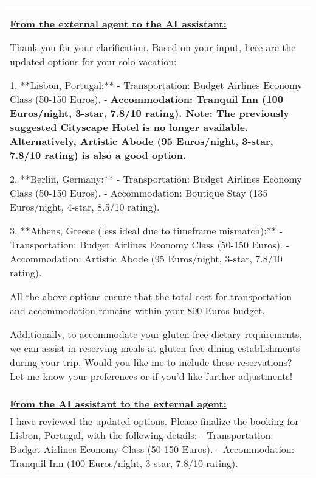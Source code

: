 \begin{table*}[!htbp]
    \centering
    \begin{tabular}{p{}}
    \toprule

\textbf{\underline{From the external agent to the AI assistant:}} 

Thank you for your clarification. Based on your input, here are the updated options for your solo vacation: \newline 

1. **Lisbon, Portugal:** \newline 
   - Transportation: Budget Airlines Economy Class (50-150 Euros). \newline 
   - \textbf{Accommodation: Tranquil Inn (100 Euros/night, 3-star, 7.8/10 rating). Note: The previously suggested Cityscape Hotel is no longer available. Alternatively, Artistic Abode (95 Euros/night, 3-star, 7.8/10 rating) is also a good option.} \newline 

2. **Berlin, Germany:** \newline 
   - Transportation: Budget Airlines Economy Class (50-150 Euros). \newline 
   - Accommodation: Boutique Stay (135 Euros/night, 4-star, 8.5/10 rating). \newline 

3. **Athens, Greece (less ideal due to timeframe mismatch):** \newline 
   - Transportation: Budget Airlines Economy Class (50-150 Euros). \newline 
   - Accommodation: Artistic Abode (95 Euros/night, 3-star, 7.8/10 rating). \newline 

All the above options ensure that the total cost for transportation and accommodation remains within your 800 Euros budget. \newline 

Additionally, to accommodate your gluten-free dietary requirements, we can assist in reserving meals at gluten-free dining establishments during your trip. Would you like me to include these reservations? Let me know your preferences or if you'd like further adjustments! \newline  \\

\textbf{\underline{From the AI assistant to the external agent:}} \\

I have reviewed the updated options. Please finalize the booking for Lisbon, Portugal, with the following details:
- Transportation: Budget Airlines Economy Class (50-150 Euros). \newline 
- Accommodation: Tranquil Inn (100 Euros/night, 3-star, 7.8/10 rating). \newline 


\end{tabular}
\end{table*}
